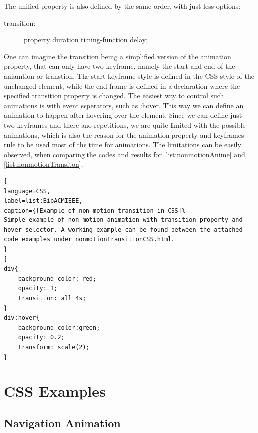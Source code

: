 The unified property is also defined by the same order, with just less options:

\begin{description}
\item [transition:] property duration timing-function delay;
\end{description}

One can imagine the transition being a simplified version of the animation property, that can only have two keyframe, namely the start and end of the aniamtion or transtion. The start keyframe style is defined in the CSS style of the unchanged element, while the end frame is defined in a declaration where the specified transition property is changed. The easiest way to control such animations is with event seperators, such as :hover. This way we can define an animation to happen after hovering over the element. Since we can define just two keyframes and there ano repetitions, we are quite limited with the possible animations, which is also the reason for the animation property and keyframes rule to be used most of the time for animations. The limitations can be easily observed, when comparing the codes and results for \ref{list:nonmotionAnime} and \ref{list:nonmotionTransiton}.

\begin{lstlisting}[
language=CSS,
label=list:BibACMIEEE,
caption={[Example of non-motion transition in CSS]%
Simple example of non-motion animation with transition property and hover selector. A working example can be found between the attached code examples under nonmotionTransitionCSS.html.
}
]
div{
	background-color: red;
	opacity: 1;
	transition: all 4s;
}
div:hover{
	background-color:green;
	opacity: 0.2;
	transform: scale(2);
}
\end{lstlisting}
\label{list:nonmotionTransiton}



\section{CSS Examples} %
\label{sec:CSS_Examples}


\subsection{Navigation Animation} %
\label{sub:navigationCSS}

